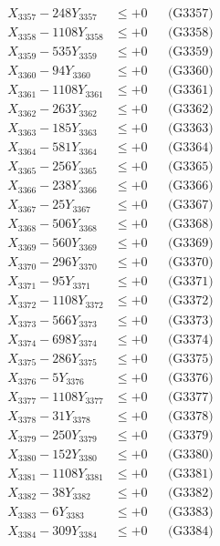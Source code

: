 \documentclass[a4paper,10pt]{article}
\begin{document}
{\begin{align}
X_{3357} - 248Y_{3357} &\leq +0 && \text{(G3357)} \\
X_{3358} - 1108Y_{3358} &\leq +0 && \text{(G3358)} \\
X_{3359} - 535Y_{3359} &\leq +0 && \text{(G3359)} \\
X_{3360} - 94Y_{3360} &\leq +0 && \text{(G3360)} \\
\allowbreak
X_{3361} - 1108Y_{3361} &\leq +0 && \text{(G3361)} \\
X_{3362} - 263Y_{3362} &\leq +0 && \text{(G3362)} \\
X_{3363} - 185Y_{3363} &\leq +0 && \text{(G3363)} \\
X_{3364} - 581Y_{3364} &\leq +0 && \text{(G3364)} \\
X_{3365} - 256Y_{3365} &\leq +0 && \text{(G3365)} \\
X_{3366} - 238Y_{3366} &\leq +0 && \text{(G3366)} \\
X_{3367} - 25Y_{3367} &\leq +0 && \text{(G3367)} \\
X_{3368} - 506Y_{3368} &\leq +0 && \text{(G3368)} \\
X_{3369} - 560Y_{3369} &\leq +0 && \text{(G3369)} \\
X_{3370} - 296Y_{3370} &\leq +0 && \text{(G3370)} \\
\allowbreak
X_{3371} - 95Y_{3371} &\leq +0 && \text{(G3371)} \\
X_{3372} - 1108Y_{3372} &\leq +0 && \text{(G3372)} \\
X_{3373} - 566Y_{3373} &\leq +0 && \text{(G3373)} \\
X_{3374} - 698Y_{3374} &\leq +0 && \text{(G3374)} \\
X_{3375} - 286Y_{3375} &\leq +0 && \text{(G3375)} \\
X_{3376} - 5Y_{3376} &\leq +0 && \text{(G3376)} \\
X_{3377} - 1108Y_{3377} &\leq +0 && \text{(G3377)} \\
X_{3378} - 31Y_{3378} &\leq +0 && \text{(G3378)} \\
X_{3379} - 250Y_{3379} &\leq +0 && \text{(G3379)} \\
X_{3380} - 152Y_{3380} &\leq +0 && \text{(G3380)} \\
\allowbreak
X_{3381} - 1108Y_{3381} &\leq +0 && \text{(G3381)} \\
X_{3382} - 38Y_{3382} &\leq +0 && \text{(G3382)} \\
X_{3383} - 6Y_{3383} &\leq +0 && \text{(G3383)} \\
X_{3384} - 309Y_{3384} &\leq +0 && \text{(G3384)} \\

\end{align}}
\end{document}
